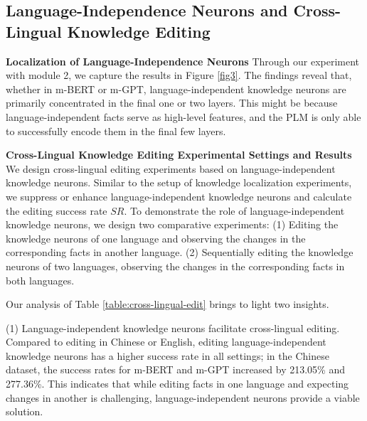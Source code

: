 \documentclass[]{article}
\newcommand{\vpara}[1]{\vspace{0.05in}\noindent\textbf{#1 }}
\begin{document}
\subsection{Language-Independence Neurons and Cross-Lingual Knowledge Editing}
\vpara{Localization of Language-Independence Neurons} 
Through our experiment with module 2, we capture the results in Figure \ref{fig3}. The findings reveal that, whether in m-BERT or m-GPT, language-independent knowledge neurons are primarily concentrated in the final one or two layers. 
This might be because language-independent facts serve as high-level features, and the PLM is only able to successfully encode them in the final few layers.

\vpara{Cross-Lingual Knowledge Editing Experimental Settings and Results}
We design cross-lingual editing experiments based on language-independent knowledge neurons. Similar to the setup of knowledge localization experiments, we suppress or enhance language-independent knowledge neurons and calculate the editing success rate \( SR \). To demonstrate the role of language-independent knowledge neurons, we design two comparative experiments:
(1) Editing the knowledge neurons of one language and observing the changes in the corresponding facts in another language. 
(2) Sequentially editing the knowledge neurons of two languages, observing the changes in the corresponding facts in both languages.

Our analysis of Table \ref{table:cross-lingual-edit} brings to light two insights.

(1) Language-independent knowledge neurons facilitate cross-lingual editing. Compared to editing in Chinese or English, editing language-independent knowledge neurons has a higher success rate in all settings; in the Chinese dataset, the success rates for m-BERT and m-GPT increased by 213.05\% and 277.36\%. This indicates that while editing facts in one language and expecting changes in another is challenging, language-independent neurons provide a viable solution.
\end{document}
